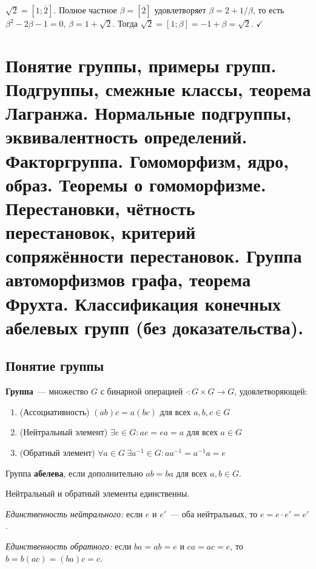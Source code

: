 \documentclass[12pt]{article}
\begin{document}
	\begin{example}
		$\sqrt{2} = [1; \overline{2}]$. Полное частное $\beta = [\overline{2}]$ удовлетворяет $\beta = 2 + 1/\beta$, то есть $\beta^2 - 2\beta - 1 = 0$, $\beta = 1 + \sqrt{2}$. Тогда $\sqrt{2} = [1; \beta] = -1 + \beta = \sqrt{2}$. $\checkmark$
	\end{example}
	
	\newpage
	
	\section{Понятие группы, примеры групп. Подгруппы, смежные классы, теорема Лагранжа. Нормальные подгруппы, эквивалентность определений. Факторгруппа. Гомоморфизм, ядро, образ. Теоремы о гомоморфизме. Перестановки, чётность перестановок, критерий сопряжённости перестановок. Группа автоморфизмов графа, теорема Фрухта. Классификация конечных абелевых групп (без доказательства).}
	
	\subsection{Понятие группы}
	
	\begin{definition}
		\textbf{Группа}~--- множество $G$ с бинарной операцией $\cdot: G \times G \to G$, удовлетворяющей:
		\begin{enumerate}
			\item (Ассоциативность) $(ab)c = a(bc)$ для всех $a, b, c \in G$
			\item (Нейтральный элемент) $\exists e \in G: ae = ea = a$ для всех $a \in G$
			\item (Обратный элемент) $\forall a \in G \ \exists a^{-1} \in G: aa^{-1} = a^{-1}a = e$
		\end{enumerate}
		Группа \textbf{абелева}, если дополнительно $ab = ba$ для всех $a, b \in G$.
	\end{definition}
	
	\begin{note}
		Нейтральный и обратный элементы единственны.
		
		\textit{Единственность нейтрального:} если $e$ и $e'$~--- оба нейтральных, то $e = e \cdot e' = e'$.
		
		\textit{Единственность обратного:} если $ba = ab = e$ и $ca = ac = e$, то $b = b(ac) = (ba)c = c$.
	\end{note}
	
\end{document}
